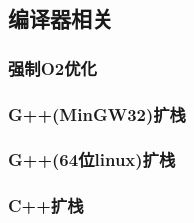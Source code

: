 \subsection{编译器相关}
\subsubsection{强制O2优化}


\subsubsection{G++(MinGW32)扩栈}


\subsubsection{G++(64位linux)扩栈}


\subsubsection{C++扩栈}

